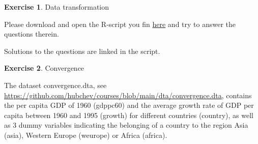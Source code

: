 \documentclass[
  12pt,
  oneside]{book}
\theoremstyle{definition}
\theoremstyle{definition}
\theoremstyle{definition}
\newtheorem{exercise}{Exercise}[chapter]
\theoremstyle{definition}
\theoremstyle{remark}
\begin{document}
\begin{exercise}
\protect\hypertarget{exr:exer4ds}{}\label{exr:exer4ds}Data transformation

Please download and open the R-script you fin \href{https://raw.githubusercontent.com/hubchev/courses/main/scr/data_transformation.R}{here} and try to answer the questions therein.

Solutions to the questions are linked in the script.
\end{exercise}

\begin{exercise}
\protect\hypertarget{exr:execonvergence}{}\label{exr:execonvergence}Convergence

The dataset convergence.dta, see \url{https://github.com/hubchev/courses/blob/main/dta/convergence.dta}, contains the per capita GDP of 1960 (gdppc60) and the average growth rate of GDP per capita between 1960 and 1995 (growth) for different countries (country), as well as 3 dummy variables indicating the belonging of a country to the region Asia (asia), Western Europe (weurope) or Africa (africa).


\end{exercise}
\end{document}
